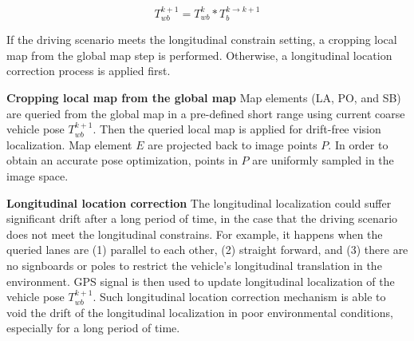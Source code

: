 \documentclass[letterpaper, 10 pt, conference]{ieeeconf}
\begin{document}
\begin{equation}
    T_{wb}^{k+1} = T_{wb}^{k} * T_{b}^{k \rightarrow k+1}
\end{equation}


If the driving scenario meets the longitudinal constrain setting, a cropping local map from the global map step is performed. Otherwise, a longitudinal location correction process is applied first.


\textbf{Cropping local map from the global map} Map elements (LA, PO, and SB) are queried from the global map in a pre-defined short range using current coarse vehicle pose $T_{wb}^{k+1}$. Then the queried local map is applied for drift-free vision localization. Map element $E$ are projected back to image points $P$. In order to obtain an accurate pose optimization, points in $P$ are uniformly sampled in the image space.


\textbf{Longitudinal location correction} The longitudinal localization could suffer significant drift after a long period of time, in the case that the driving scenario does not meet the longitudinal constrains. For example, it happens when the queried lanes are (1) parallel to each other, (2) straight forward, and (3) there are no signboards or poles to restrict the vehicle's longitudinal translation in the environment. GPS signal is then used to update longitudinal localization of the vehicle pose $T_{wb}^{k+1}$. Such longitudinal location correction mechanism is able to void the drift of the longitudinal localization in poor environmental conditions, especially for a long period of time.
\end{document}
